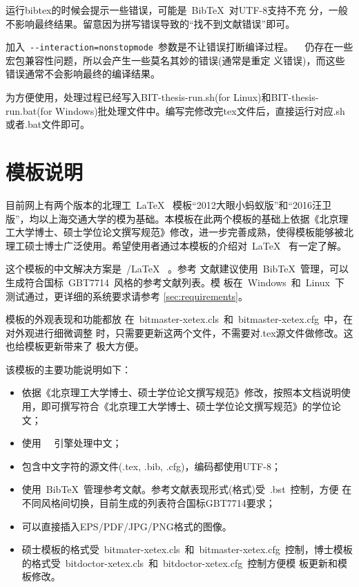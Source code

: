 运行bibtex的时候会提示一些错误，可能是~{{\sc Bib}\TeX}~对UTF-8支持不充
分，一般不影响最终结果。留意因为拼写错误导致的``找不到文献错误''即可。

加入~\verb|--interaction=nonstopmode|~参数是不让错误打断编译过程。
\XeTeX~ 仍存在一些宏包兼容性问题，所以会产生一些莫名其妙的错误(通常是重定
义错误)，而这些错误通常不会影响最终的编译结果。
  
为方便使用，处理过程已经写入BIT-thesis-run.sh(for Linux)和BIT-thesis-run.bat(for Windows)批处理文件中。编写完修改完tex文件后，直接运行对应.sh或者.bat文件即可。

\section{模板说明}
\label{sec:features}
 
目前网上有两个版本的北理工~\LaTeX~ 模板“2012大眼小蚂蚁版”和“2016汪卫版”，均以上海交通大学的模为基础。本模板在此两个模板的基础上依据《北京理工大学博士、硕士学位论文撰写规范》修改，进一步完善成熟，使得模板能够被北理工硕士博士广泛使用。希望使用者通过本模板的介绍对~\LaTeX~ 有一定了解。

这个模板的中文解决方案是~\XeTeX/\LaTeX~ 。参考
文献建议使用~BibTeX~管理，可以生成符合国标~GBT7714~风格的参考文献列表。模
板在~Windows~和~Linux~下测试通过，更详细的系统要求请参考
\ref{sec:requirements}。

模板的外观表现和功能都放
在~bitmaster-xetex.cls~和~bitmaster-xetex.cfg~中，在对外观进行细微调整
时，只需要更新这两个文件，不需要对.tex源文件做修改。这也给模板更新带来了
极大方便。

该模板的主要功能说明如下：

\begin{itemize}
\item \inv 依据《北京理工大学博士、硕士学位论文撰写规范》修改，按照本文档说明使用，即可撰写符合《北京理工大学博士、硕士学位论文撰写规范》的学位论文；
\item \inv 使用~\XeTeX~ 引擎处理中文；
\item \inv 包含中文字符的源文件(.tex, .bib, .cfg)，编码都使用UTF-8；
\item \inv 使用~BibTeX~管理参考文献。参考文献表现形式(格式)受~.bst~控制，方便
  在不同风格间切换，目前生成的列表符合国标GBT7714要求；
\item \inv 可以直接插入EPS/PDF/JPG/PNG格式的图像。
\item \inv 硕士模板的格式受~bitmater-xetex.cls~和~bitmaster-xetex.cfg~控制，博士模板的格式受~bitdoctor-xetex.cls~和~bitdoctor-xetex.cfg~控制方便模
  板更新和模板修改。
\end{itemize}
 
